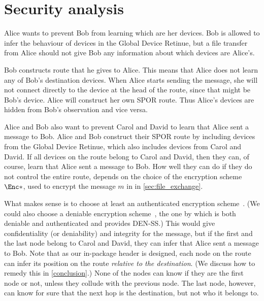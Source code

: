 \section{Security analysis}%
\label{SecurityAnalysis}

Alice wants to prevent Bob from learning which are her devices.
Bob is allowed to infer the behaviour of devices in the Global Device Retinue, 
but a file transfer from Alice should not give Bob any information about which 
devices are Alice's.

Bob constructs  route that he gives to Alice.
This means that Alice does not learn any of Bob's destination devices.
When Alice starts sending the message, she will not connect directly to the 
device at the head of the route, since that might be Bob's device.
Alice will construct her own \ac{SPOR} route.
Thus Alice's devices are hidden from Bob's observation and vice versa.

Alice and Bob also want to prevent Carol and David to learn that Alice sent a 
message to Bob.
Alice and Bob construct their \ac{SPOR} route by including devices from the 
Global Device Retinue, which also includes devices from Carol and David.
If all devices on the route belong to Carol and David, then they can, of course, 
learn that Alice sent a message to Bob.
How well they can do if they do not control the entire route, depends on the 
choice of the encryption scheme \(\Enc*\), used to encrypt the message \(m\) in 
in \cref{sec:file_exchange}.

What makes sense is to choose at least an authenticated encryption 
scheme~\cite{AuthEncryption}.
(We could also choose a deniable encryption scheme~\cite{DeniableEncryption}, 
\eg the one by \textcite{OTPKX} which is both deniable and authenticated and 
provides \ac{DEN-SS}.)
This would give confidentiality (or deniability) and integrity for the message, 
but if the first and the last node belong to Carol and David, they can infer 
that Alice sent a message to Bob.
Note that as our in-package header is designed, each node on the route can infer 
its position on the route \emph{relative to the destination}.
(We discuss how to remedy this in \cref{conclusion}.)
None of the nodes can know if they are the first node or not, unless they 
collude with the previous node.
The last node, however, can know for sure that the next hop is the destination, 
but not who it belongs to.

